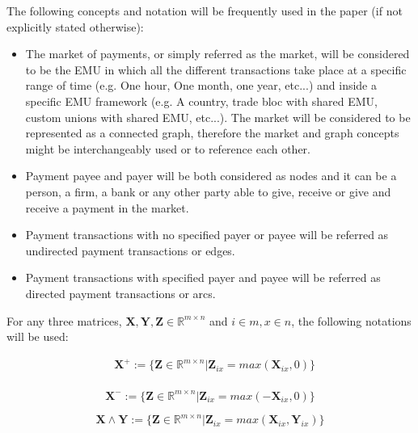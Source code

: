\documentclass[12pt]{article}
\begin{document}
\begin{multicols}{2}
The following concepts and notation will be frequently used in the paper (if not explicitly stated otherwise):

\begin{itemize}
  \item The market of payments, or simply referred as the market, will be considered to be the EMU in which all the different transactions take place at a specific range of time (e.g. One hour, One month, one year, etc...) and inside a specific EMU framework (e.g. A country, trade bloc with shared EMU, custom unions with shared EMU, etc...). The market will be considered to be represented as a connected graph, therefore the market and graph concepts might be interchangeably used or to reference each other.
  
  \item Payment payee and payer will be both considered as nodes and it can be a person, a firm, a bank or any other party able to give, receive or give and receive a payment in the market.
  \item Payment transactions with no specified payer or payee will be referred as undirected payment transactions or edges. 
  \item Payment transactions with specified payer and payee will be referred as directed payment transactions or arcs.
\end{itemize}

For any three matrices, $\textbf{X}, \textbf{Y}, \textbf{Z} \in \mathbb{R}^{m \times n}$ and $ i \in m, x \in n$, the following notations will be used:

\begin{equation} \label{eq1}
\begin{split}
    & \textbf{X}^{+} := \{\textbf{Z} \in \mathbb{R}^{m \times n} | \textbf{Z}_{ix} = max(\textbf{X}_{ix},0)\} \\
\end{split}
\end{equation}

\begin{equation} \label{eq2}
\textbf{X}^{-} := \{\textbf{Z} \in \mathbb{R}^{m \times n} | \textbf{Z}_{ix} = max(-\textbf{X}_{ix},0)\}
\end{equation}


\begin{equation} \label{eq3}
\textbf{X} \land \textbf{Y} := \{\textbf{Z} \in \mathbb{R}^{m \times n} | \textbf{Z}_{ix} = max(\textbf{X}_{ix},\textbf{Y}_{ix})\}
\end{equation}


\end{multicols}
\end{document}

